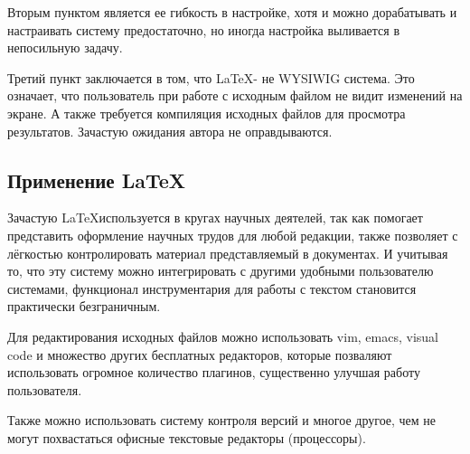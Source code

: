 			Вторым пунктом является ее гибкость в настройке, хотя и можно дорабатывать и
			настраивать систему предостаточно, но иногда настройка выливается в непосильную задачу.

			Третий пункт заключается в том, что \LaTeX - не WYSIWIG система. Это означает, что пользователь при работе с исходным файлом не видит изменений на экране.
			А также требуется компиляция исходных файлов для просмотра результатов. Зачастую ожидания автора не оправдываются.

	\subsection{Применение \LaTeX}
		Зачастую \LaTeX используется в кругах научных деятелей, так как помогает представить оформление научных трудов для любой редакции,
		также позволяет с лёгкостью контролировать материал представляемый в документах. И учитывая то, что эту систему можно интегрировать с
		другими удобными пользователю системами, функционал инструментария для работы с текстом становится практически безграничным.
		
		Для редактирования исходных файлов можно использовать vim, emacs, visual code и множество других бесплатных редакторов, которые позваляют использовать огромное количество
		плагинов, существенно улучшая работу пользователя.
		
		Также можно использовать систему контроля версий и многое другое, чем не могут похвастаться офисные текстовые редакторы (процессоры).
